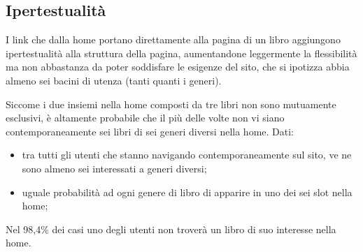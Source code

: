 \subsection{Ipertestualità}
I link che dalla home portano direttamente alla pagina di un libro aggiungono
ipertestualità alla struttura della pagina, aumentandone leggermente la
flessibilità ma non abbastanza da poter soddisfare le esigenze del sito, che
si ipotizza abbia almeno sei bacini di utenza (tanti quanti i generi).

Siccome i due insiemi nella home composti da tre libri non sono mutuamente
esclusivi, è altamente probabile che il più delle volte non vi siano
contemporaneamente sei libri di sei generi diversi nella home.
Dati:
\begin{itemize}
\item tra tutti gli utenti che stanno navigando contemporaneamente sul sito,
ve ne sono almeno sei interessati a generi diversi;
\item uguale probabilità ad ogni genere di libro di apparire in uno dei sei
slot nella home;
\end{itemize}
Nel 98,4\% dei casi uno degli utenti non troverà un libro di suo interesse
nella home.
